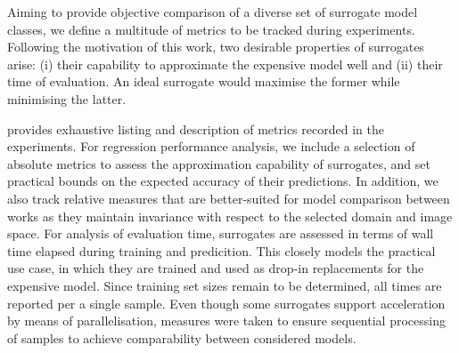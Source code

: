 Aiming to provide objective comparison of a diverse set of surrogate model
classes, we define a multitude of metrics to be tracked during experiments.
Following the motivation of this work, two desirable properties of surrogates
arise: (i) their capability to approximate the expensive
model well and (ii) their time of evaluation. An ideal surrogate would maximise
the former while minimising the latter.

 provides exhaustive listing and description of metrics recorded
in the experiments. For regression performance analysis, we include a selection
of absolute metrics to assess the approximation capability of surrogates, and set
practical bounds on the expected accuracy of their predictions. In addition, we also track
relative measures that are better-suited for model comparison between works as
they maintain invariance with respect to the selected domain and image space.
For analysis of evaluation time, surrogates are assessed in terms of wall time
elapsed during training and predicition. This closely models the practical use
case, in which they are trained and used as drop-in replacements for the
expensive model. Since training set sizes remain to be determined, all times are
reported per a single sample. Even though some surrogates support acceleration
by means of parallelisation, measures were taken to ensure sequential
processing of samples to achieve comparability between considered models.

